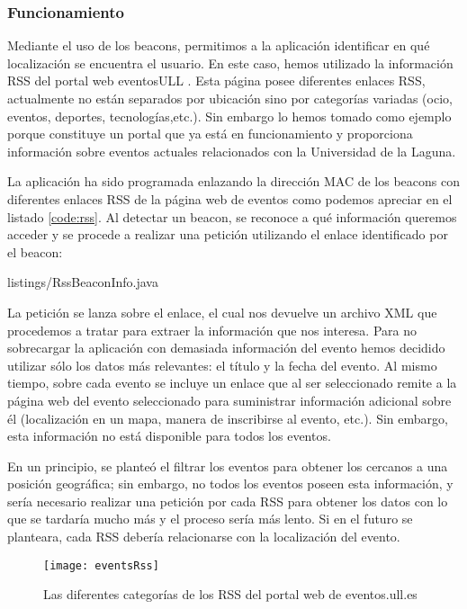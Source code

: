 \subsubsection{Funcionamiento}


Mediante el uso de los beacons, permitimos a la aplicación identificar en qué localización se encuentra el usuario. En este caso, hemos utilizado la información RSS del portal web eventosULL \cite{URL::eventsull}. Esta página posee diferentes enlaces RSS, actualmente no están separados por ubicación sino por categorías variadas (ocio, eventos, deportes, tecnologías,etc.). Sin embargo lo hemos tomado como ejemplo porque constituye un portal que ya está en funcionamiento y proporciona información sobre eventos actuales relacionados con la Universidad de la Laguna. 


La aplicación ha sido programada enlazando la dirección MAC de los beacons con diferentes enlaces RSS de la página web de eventos como podemos apreciar en el listado \ref{code:rss}. Al detectar un beacon, se reconoce a qué información queremos acceder y se procede a realizar una petición utilizando el enlace identificado por el beacon: 


{listings/RssBeaconInfo.java} %

La petición se lanza sobre el enlace, el cual nos devuelve un archivo XML que procedemos a tratar para extraer la información que nos interesa. Para no sobrecargar la aplicación con demasiada información del evento hemos decidido utilizar sólo los datos más relevantes: el título y la fecha del evento. Al mismo tiempo, sobre cada evento se incluye un enlace que al ser seleccionado remite a la página web del evento seleccionado para suministrar información adicional sobre él (localización en un mapa, manera de inscribirse al evento, etc.). Sin embargo, esta información no está disponible para todos los eventos.


En un principio, se planteó el filtrar los eventos para obtener los cercanos a una posición geográfica; sin embargo, no todos los eventos poseen esta información, y sería necesario realizar una petición por cada RSS para obtener los datos con lo que se tardaría mucho más y el proceso sería más lento. Si en el futuro se planteara, cada RSS debería relacionarse con la localización del evento.

\begin{figure}[H]
	\centering
	\texttt{[image: eventsRss]}
	\caption{Las diferentes categorías de los RSS del portal web de eventos.ull.es}
	\label{fig:eventsRss}
\end{figure}


